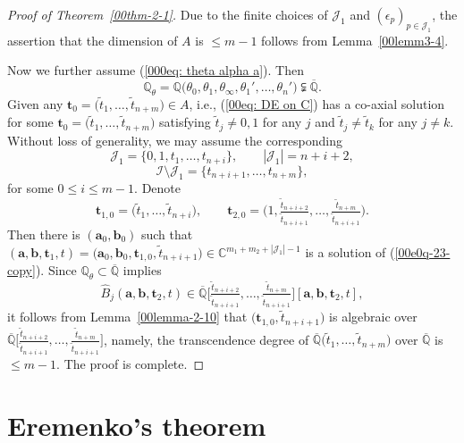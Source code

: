 \documentclass[pdftex]{sigma}
\numberwithin{equation}{section}
\def\C{\mathbb C}
\def\Q{\mathbb Q}
\begin{document}
\begin{proof}[Proof of Theorem~\ref{00thm-2-1}] Due to the finite choices of $\mathcal{J}_1$ and $(\epsilon_p)_{p\in\mathcal{J}_1}$, the assertion that the dimension of $A$ is $\leq m-1$ follows from Lemma~\ref{00lemm3-4}.

Now we further assume (\ref{000eq: theta alpha a}). Then
\[
 \Q_{\theta}=\Q\bigl(\theta_0,\theta_1,\theta_\infty,\theta_1',
 \dots,\theta_n'\bigr)\subsetneqq \overline{\Q}.
\]
Given any $\boldsymbol t_0=\bigl(\tilde{t}_{1},\dots, \tilde{t}_{n+m}\bigr)
\in A$, i.e., (\ref{00eq: DE on C}) has a co-axial solution for some
$\boldsymbol t_0=\bigl(\tilde{t}_{1},\dots, \tilde{t}_{n+m}\bigr)$ satisfying
$\tilde{t}_{j}\neq 0,1$ for any $j$ and $\tilde{t}_{j}\neq
\tilde{t}_{k}$ for any $j\neq k$. Without loss of generality, we may
assume the corresponding
\[
 \mathcal{J}_1=\{0,1,t_1,\dots, t_{n+i}\},\qquad
 |\mathcal{J}_1|=n+i+2,
\]
\[
 \mathcal{I}\setminus \mathcal{J}_1=\{t_{n+i+1},\dots,t_{n+m}\},
\]
for some $0\leq i\leq m-1$. Denote
\[
 \boldsymbol t_{1,0}=\bigl(\tilde{t}_1,\dots,\tilde{t}_{n+i}\bigr),
 \qquad \boldsymbol
t_{2,0}=\Big(1,\tfrac{\tilde{t}_{n+i+2}}{\tilde{t}_{n+i+1}},\dots,
\tfrac{\tilde{t}_{n+m}}{\tilde{t}_{n+i+1}}\Big).
\]
Then there is $(\boldsymbol a_0, \boldsymbol b_0)$ such that
$(\boldsymbol a, \boldsymbol b, \boldsymbol t_1, t)=\bigl(\boldsymbol a_0,
\boldsymbol b_0, \boldsymbol t_{1,0}, \tilde{t}_{n+i+1}\bigr)\in
\C^{m_1+m_2+|\mathcal{J}_1|-1}$ is a solution of
(\ref{00e0q-23-copy}). Since $\Q_{\theta}\subset\overline{\Q}$
implies
\[
 \widehat{B}_j(\boldsymbol a, \boldsymbol b,\boldsymbol t_2, t)
 \in\overline{\Q}\Big[\tfrac{\tilde{t}_{n+i+2}}{\tilde{t}_{n+i+1}},
 \dots, \tfrac{\tilde{t}_{n+m}}{\tilde{t}_{n+i+1}}\Big][\boldsymbol a,
 \boldsymbol b,\boldsymbol t_2,t],
\]
it follows from Lemma~\ref{00lemma-2-10} that $\bigl(\boldsymbol t_{1,0},
\tilde{t}_{n+i+1}\bigr)$ is algebraic over
$\overline{\Q}\Big[\tfrac{\tilde{t}_{n+i+2}}{\tilde{t}_{n+i+1}},\dots,
\tfrac{\tilde{t}_{n+m}}{\tilde{t}_{n+i+1}}\Big]$, namely, the
transcendence degree of $\overline{\Q}\bigl(\tilde{t}_{1},\dots,
\tilde{t}_{n+m}\bigr)$ over $\overline{\Q}$ is $\leq m-1$. The proof is
complete.
\end{proof}


\section{Eremenko's theorem}
\label{sec-Eremenko}
\end{document}
